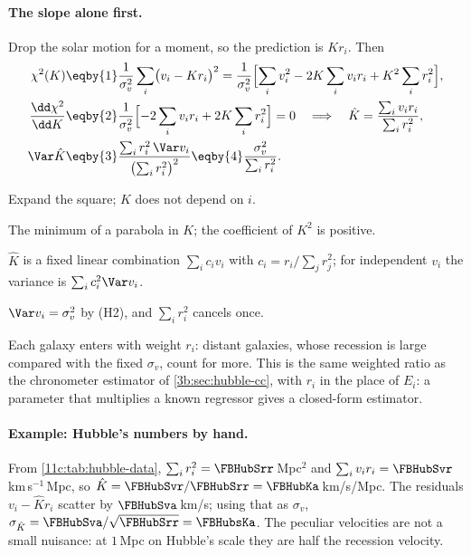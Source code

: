 \paragraph{The slope alone first.} Drop the solar motion for a moment, so the
prediction is $Kr_i$. Then
\begin{align}
  \chi^2(K)
  &\eqby{1}\frac{1}{\sigma_v^2}\sum_i\bigl(v_i-Kr_i\bigr)^2
   =\frac{1}{\sigma_v^2}\Bigl[\sum_iv_i^2-2K\sum_iv_ir_i+K^2\sum_ir_i^2\Bigr],
  \nonumber\\
  \frac{\dd\chi^2}{\dd K}
  &\eqby{2}\frac{1}{\sigma_v^2}\Bigl[-2\sum_iv_ir_i+2K\sum_ir_i^2\Bigr]=0
  \quad\Longrightarrow\quad
  \hat K=\frac{\sum_iv_ir_i}{\sum_ir_i^2},
  \label{11c:eq:k-origin}\\
  \Var\hat K
  &\eqby{3}\frac{\sum_ir_i^2\,\Var v_i}{\bigl(\sum_ir_i^2\bigr)^2}
   \eqby{4}\frac{\sigma_v^2}{\sum_ir_i^2}.
  \nonumber
\end{align}
\begin{explain}
  \item Expand the square; $K$ does not depend on $i$.
  \item The minimum of a parabola in $K$; the coefficient of $K^2$ is positive.
  \item $\hat K$ is a fixed linear combination $\sum_ic_iv_i$ with
        $c_i=r_i/\sum_jr_j^2$; for independent $v_i$ the variance is
        $\sum_ic_i^2\Var v_i$.
  \item $\Var v_i=\sigma_v^2$ by (H2), and $\sum_ir_i^2$ cancels once.
\end{explain}
Each galaxy enters with weight $r_i$: distant galaxies, whose recession is large
compared with the fixed $\sigma_v$, count for more. This is the same weighted
ratio as the chronometer estimator of \cref{3b:sec:hubble-cc}, with $r_i$ in the
place of $E_i$: a parameter that multiplies a known regressor gives a closed-form
estimator.

\paragraph{Example: Hubble's numbers by hand.} From
\cref{11c:tab:hubble-data}, $\sum_ir_i^2=\FBHubSrr$\,Mpc$^2$ and
$\sum_iv_ir_i=\FBHubSvr$\,km\,s$^{-1}$\,Mpc, so
$\hat K=\FBHubSvr/\FBHubSrr=\FBHubKa$\,km/s/Mpc. The residuals $v_i-\hat Kr_i$
scatter by $\FBHubSva$\,km/s; using that as $\sigma_v$,
$\sigma_{\hat K}=\FBHubSva/\sqrt{\FBHubSrr}=\FBHubsKa$. The peculiar velocities
are not a small nuisance: at $1$\,Mpc on Hubble's scale they are half the
recession velocity.

